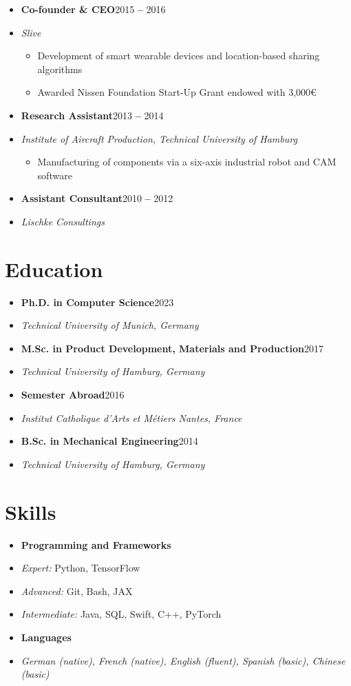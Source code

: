 \documentclass[a4paper,11pt]{article}
\newcommand{\entry}[1]{\item \small #1\vspace{-7pt}}
\newcommand{\entryBf}[2]{\item \textbf{#1}\hfill #2\vspace{-9pt}}
\newcommand{\entryIt}[1]{\item \textit{\small #1}\vspace{-7pt}}
\newcommand{\cvItemizeBegin}{\begin{itemize}[rightmargin=75pt]}
\newcommand{\cvItemizeEnd}{\end{itemize} \vspace{-7pt}}
\newcommand{\cvItem}[1]{\item[--] \small #1\vspace{-2pt}}
\begin{document}
\begin{itemize}
    \entryBf{Co-founder \& CEO}{2015 \textbf{--} 2016}
    \entryIt{Slive}
    \cvItemizeBegin
        \cvItem{Development of smart wearable devices and location-based sharing algorithms}
        \cvItem{Awarded Nissen Foundation Start-Up Grant endowed with 3,000\euro}
    \cvItemizeEnd
    
    \entryBf{Research Assistant}{2013 \textbf{--} 2014}
    \entryIt{Institute of Aircraft Production, Technical University of Hamburg}
    \cvItemizeBegin
        \cvItem{Manufacturing of components via a six-axis industrial robot and CAM software}
    \cvItemizeEnd
    
    \entryBf{Assistant Consultant}{2010 \textbf{--} 2012}
    \entryIt{Lischke Consultings}

\end{itemize}

\section{Education}
\begin{itemize}
    \entryBf{Ph.D. in Computer Science}{2023}
    \entryIt{Technical University of Munich, Germany}{}
    
    \entryBf{M.Sc. in Product Development, Materials and Production}{2017}
    \entryIt{Technical University of Hamburg, Germany}
    
    \entryBf{Semester Abroad}{2016}
    \entryIt{Institut Catholique d'Arts et M\'etiers Nantes, France}
    
    \entryBf{B.Sc. in Mechanical Engineering}{2014}
    \entryIt{Technical University of Hamburg, Germany}
\end{itemize}

\section{Skills}
\begin{itemize}
    \entryBf{Programming and Frameworks}{}
    \entry{\textit{Expert:} Python, TensorFlow}
    \entry{\textit{Advanced:} Git, Bash, JAX}
    \entry{\textit{Intermediate:} Java, SQL, Swift, C++, PyTorch}
    \entryBf{Languages}{}
    \entryIt{German (native), French (native), English (fluent), Spanish (basic), Chinese (basic)}
\end{itemize}
\end{document}
